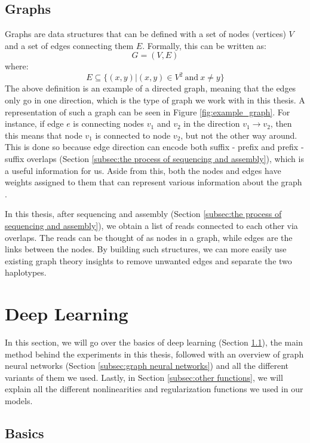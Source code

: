 \documentclass[times, utf8, diplomski, english]{fer_eng}
\begin{document}
\subsection{Graphs}

Graphs are data structures that can be defined with a set of nodes (vertices) $V$ and a set of edges connecting them $E$. Formally, this can be written as:
\[ G = (V, E) \]
where:
\[ E \subseteq 	\{ (x, y)|(x, y) \in V^2 \mathrm{\ and\ } x \neq y \} \]
The above definition is an example of a directed graph, meaning that the edges only go in one direction, which is the type of graph we work with in this thesis. A representation of such a graph can be seen in Figure \ref{fig:example_graph}. For instance, if edge $e$ is connecting nodes $v_1$ and $v_2$ in the direction $v_1 \rightarrow v_2$, then this means that node $v_1$ is connected to node $v_2$, but not the other way around. This is done so because edge direction can encode both suffix - prefix and prefix - suffix overlaps (Section \ref{subsec:the process of sequencing and assembly}), which is a useful information for us. Aside from this, both the nodes and edges have weights assigned to them that can represent various information about the graph \cite{trudeau_2017}.

In this thesis, after sequencing and assembly (Section \ref{subsec:the process of sequencing and assembly}), we obtain a list of reads connected to each other via overlaps. The reads can be thought of as nodes in a graph, while edges are the links between the nodes. By building such structures, we can more easily use existing graph theory insights to remove unwanted edges and separate the two haplotypes.

\section{Deep Learning}

In this section, we will go over the basics of deep learning (Section \ref{subsec:basics}), the main method behind the experiments in this thesis, followed with an overview of graph neural networks (Section \ref{subsec:graph neural networks}) and all the different variants of them we used. Lastly, in Section \ref{subsec:other functions}, we will explain all the different nonlinearities and regularization functions we used in our models.

\subsection{Basics}
\label{subsec:basics}
\end{document}
